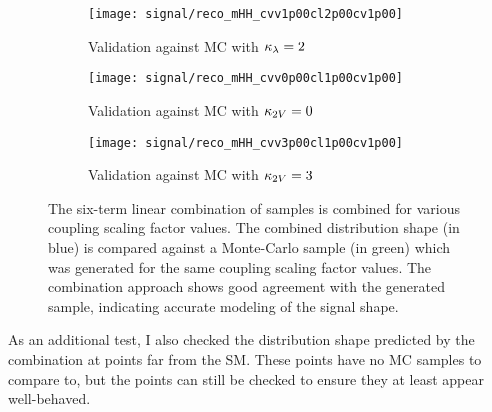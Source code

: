     \begin{figure}[tbh]
    	\centering
        \begin{subfigure}{0.32\textwidth}
            \texttt{[image: signal/reco\_mHH\_cvv1p00cl2p00cv1p00]}
            \captionsetup{justification=centering} \caption{Validation against MC with $\kappa_{\lambda}=2$}
        \end{subfigure}
        \begin{subfigure}{0.32\textwidth}
            \texttt{[image: signal/reco\_mHH\_cvv0p00cl1p00cv1p00]}
            \captionsetup{justification=centering} \caption{Validation against MC with $\kappa_{2V}=0$}
        \end{subfigure}
        \begin{subfigure}{0.32\textwidth}
            \texttt{[image: signal/reco\_mHH\_cvv3p00cl1p00cv1p00]}
            \captionsetup{justification=centering} \caption{Validation against MC with $\kappa_{2V}=3$}
        \end{subfigure}
        \caption{
            The six-term linear combination of samples is combined for various coupling scaling factor values.
            The combined distribution shape (in blue) is compared against a Monte-Carlo sample (in green)
                which was generated for the same coupling scaling factor values.
            The combination approach shows good agreement with the generated sample, indicating accurate modeling of the signal shape.
        }
        \label{fig:vbf_hh_validation}
    \end{figure}

    As an additional test, I also checked the distribution shape predicted by the combination at points far from the SM.
    These points have no MC samples to compare to, but the points can still be checked to ensure they at least appear well-behaved.

